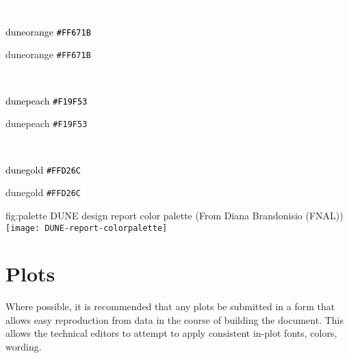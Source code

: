 \begin{minipage}[t]{0.3\linewidth}
  \begin{tcolorbox}[colback=duneorange]
    \textcolor{white}{duneorange \texttt{\#FF671B}}

    \textcolor{black}{duneorange \texttt{\#FF671B}}
  \end{tcolorbox}
  \begin{tcolorbox}[colback=white,colframe=duneorange]
    \textcolor{duneorange}{duneorange \texttt{\#FF671B}}
  \end{tcolorbox}
\end{minipage}
\begin{minipage}[t]{0.3\linewidth}
  \begin{tcolorbox}[colback=dunepeach]
    \textcolor{white}{dunepeach \texttt{\#F19F53}}

    \textcolor{black}{dunepeach \texttt{\#F19F53}}    
  \end{tcolorbox}
  \begin{tcolorbox}[colback=white,colframe=dunepeach]
    \textcolor{dunepeach}{dunepeach \texttt{\#F19F53}}
  \end{tcolorbox}
\end{minipage}
\begin{minipage}[t]{0.3\linewidth}
  \begin{tcolorbox}[colback=dunegold]
    \textcolor{white}{dunegold \texttt{\#FFD26C}}

    \textcolor{black}{dunegold \texttt{\#FFD26C}}
  \end{tcolorbox}
  \begin{tcolorbox}[colback=white,colframe=dunegold]
    \textcolor{dunegold}{dunegold \texttt{\#FFD26C}}
  \end{tcolorbox}
\end{minipage}



\begin{dunefigure}{fig:palette}
  {DUNE design report color palette (From Diana Brandonisio (FNAL))}
  \texttt{[image: DUNE-report-colorpalette]}
\end{dunefigure}

\section{Plots}
\label{sec:graphic-plots}

Where possible, it is recommended that any plots be submitted in a
form that allows easy reproduction from data in the course of building
the document.
This allows the technical editors to attempt to apply consistent
in-plot fonts, colors, wording.

